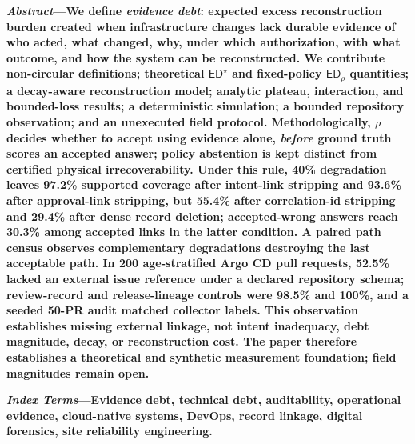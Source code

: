 \documentclass[10pt,twocolumn]{article}
\theoremstyle{ieeedef}
\newcommand{\ED}{\mathsf{ED}}
\begin{document}

\noindent\textbf{\textit{Abstract}---We define \emph{evidence debt}: expected excess reconstruction burden created when infrastructure changes lack durable evidence of who acted, what changed, why, under which authorization, with what outcome, and how the system can be reconstructed. We contribute non-circular definitions; theoretical $\ED^{\star}$ and fixed-policy $\ED_\rho$ quantities; a decay-aware reconstruction model; analytic plateau, interaction, and bounded-loss results; a deterministic simulation; a bounded repository observation; and an unexecuted field protocol. Methodologically, $\rho$ decides whether to accept using evidence alone, \emph{before} ground truth scores an accepted answer; policy abstention is kept distinct from certified physical irrecoverability. Under this rule, 40\% degradation leaves 97.2\% supported coverage after intent-link stripping and 93.6\% after approval-link stripping, but 55.4\% after correlation-id stripping and 29.4\% after dense record deletion; accepted-wrong answers reach 30.3\% among accepted links in the latter condition. A paired path census observes complementary degradations destroying the last acceptable path. In 200 age-stratified Argo CD pull requests, 52.5\% lacked an external issue reference under a declared repository schema; review-record and release-lineage controls were 98.5\% and 100\%, and a seeded 50-PR audit matched collector labels. This observation establishes missing external linkage, not intent inadequacy, debt magnitude, decay, or reconstruction cost. The paper therefore establishes a theoretical and synthetic measurement foundation; field magnitudes remain open.}

\vspace{4pt}
\noindent\textbf{\textit{Index Terms}---Evidence debt, technical debt, auditability, operational evidence, cloud-native systems, DevOps, record linkage, digital forensics, site reliability engineering.}
\vspace{8pt}














\balance


\end{document}
